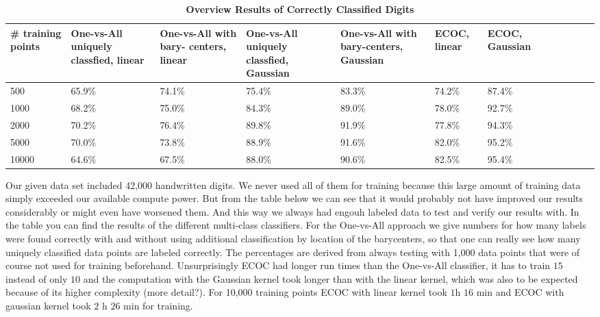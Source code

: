\begin{table}[ht!]
	\centering
	\caption{\textbf{Overview Results of Correctly Classified Digits}}
	\begin{tabular}{|l|l|l|l|l|l|l|l|l|l|l|l|} \hline
		\multicolumn{1}{|p{1.8cm}|}{\vspace*{.7 cm}\# training points} &
		\multicolumn{1}{p{1.8cm}|}{\vspace*{0 cm}\hbox{One-vs-All} uniquely classfied, linear} &
		\multicolumn{1}{p{1.8cm}|}{\vspace*{0 cm}\hbox{One-vs-All} with bary- centers, linear} &
		\multicolumn{1}{p{1.8cm}|}{\vspace*{0 cm}\hbox{One-vs-All} uniquely classfied, Gaussian} &
		\multicolumn{1}{p{1.8cm}|}{\vspace*{0 cm}\hbox{One-vs-All} with bary-centers, Gaussian} &
		\multicolumn{1}{p{1.8cm}|}{\vspace*{.7 cm}ECOC, \hbox{linear}} &
		\multicolumn{1}{p{1.8cm}|}{\vspace*{.7 cm}ECOC, Gaussian} \\ \hline \hline
		500	& 65.9\% & 74.1\% & 75.4\% & 83.3\% & 74.2\% & 87.4\% \\ \hline
		1000	& 68.2\% & 75.0\% & 84.3\% & 89.0\% & 78.0\% & 92.7\% \\ \hline
		2000	& 70.2\% & 76.4\% & 89.8\% & 91.9\% & 77.8\% & 94.3\% \\ \hline
		5000	& 70.0\% & 73.8\% & 88.9\% & 91.6\% & 82.0\% & 95.2\% \\ \hline
		10000	& 64.6\% & 67.5\% & 88.0\% & 90.6\% & 82.5\% & 95.4\% \\ \hline
	\end{tabular}
\end{table}

\smallskip
Our given data set included 42,000 handwritten digits. We never used all of them for training because this large amount of training data simply exceeded our available compute power. But from the table below we can see that it would probably not have improved our results considerably or might even have worsened them. And this way we always had engouh labeled data to test and verify our results with. In the table you can find the results of the different multi-class classifiers. For the One-vs-All approach we give numbers for how many labels were found correctly with and without using additional classification by location of the barycenters, so that one can really see how many uniquely classified data points are labeled correctly. The percentages are derived from always testing with 1,000 data points that were of course not used for training beforehand. Unsurprisingly ECOC had longer run times than the One-vs-All classifier, it has to train $15$ instead of only $10$ and the computation with the Gaussian kernel took longer than with the linear kernel, which was also to be expected because of its higher complexity (more detail?). For 10,000 training points ECOC with linear kernel took $1$h $16$ min and ECOC with gaussian kernel took $2$ h $26$ min for training.  

